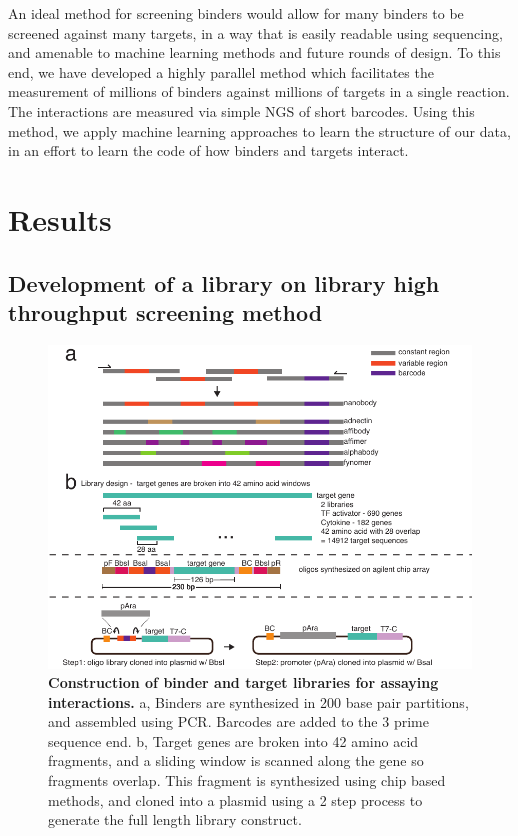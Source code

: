 An ideal method for screening binders would allow for many binders to be screened against many targets, in a way that is easily readable using sequencing, and amenable to machine learning methods and future rounds of design. To this end, we have developed a highly parallel method which facilitates the measurement of millions of binders against millions of targets in a single reaction. The interactions are measured via simple NGS of short barcodes. Using this method, we apply machine learning approaches to learn the structure of our data, in an effort to learn the code of how binders and targets interact. 

\section{Results}
\subsection{Development of a library on library high throughput screening method}

\begin{figure}[b!]
\includegraphics[width=\textwidth]{figures/chapter3/20190621_fig1_design_and_t7.pdf}
\caption[Construction of binder and target libraries for assaying interactions]{\textbf{Construction of binder and target libraries for assaying interactions.}
a, Binders are synthesized in 200 base pair partitions, and assembled using PCR. Barcodes are added to the 3 prime sequence end. b, Target genes are broken into 42 amino acid fragments, and a sliding window is scanned along the gene so fragments overlap. This fragment is synthesized using chip based methods, and cloned into a plasmid using a 2 step process to generate the full length library construct.
\label{chap3-library-design}}
\end{figure}

